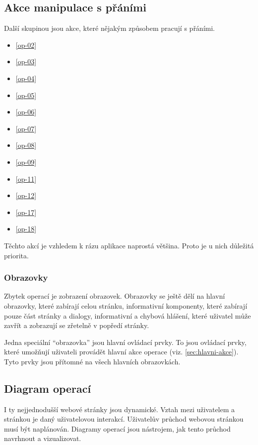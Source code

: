 \subsection{Akce manipulace s přáními}
Další skupinou jsou akce, které nějakým způsobem pracují s přáními.
\begin{multicols}{2}
\begin{itemize}
\item \ref{op-02}
\item \ref{op-03}
\item \ref{op-04}
\item \ref{op-05}
\item \ref{op-06}
\item \ref{op-07}
\item \ref{op-08}
\item \ref{op-09}
\item \ref{op-11}
\item \ref{op-12}
\item \ref{op-17}
\item \ref{op-18}
\end{itemize}
\end{multicols}

Těchto akcí je vzhledem k rázu aplikace naprostá většina. Proto je u nich důležitá priorita.

\subsubsection{Obrazovky}
Zbytek operací je zobrazení obrazovek. Obrazovky se ještě dělí na hlavní obrazovky, které zabírají celou stránku, informativní komponenty, které zabírají pouze část stránky a dialogy, informativní a chybová hlášení, které uživatel může zavřít a zobrazují se zřetelně v popředí stránky.

Jedna speciální ``obrazovka'' jsou hlavní ovládací prvky. To jsou ovládací prvky, které umožňují uživateli provádět hlavní akce operace (viz. \ref{sec:hlavni-akce}). Tyto prvky jsou přítomné na všech hlavních obrazovkách.

\subsection{Diagram operací}
I ty nejjednodušší webové stránky jsou dynamické. Vztah mezi uživatelem a stránkou je daný uživatelovou interakcí. Uživatelův průchod webovou stránkou musí být naplánován. Diagramy operací jsou nástrojem, jak tento průchod navrhnout a vizualizovat\cite{brown2007communicating}.

